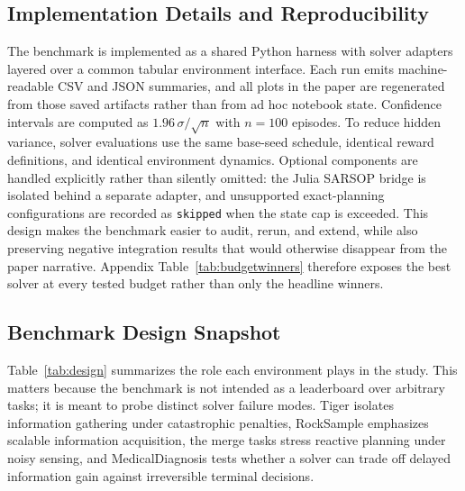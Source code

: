 \documentclass[10pt,twocolumn]{article}
\begin{document}
\subsection{Implementation Details and Reproducibility}
The benchmark is implemented as a shared Python harness with solver adapters layered over a common tabular environment interface. Each run emits machine-readable CSV and JSON summaries, and all plots in the paper are regenerated from those saved artifacts rather than from ad hoc notebook state. Confidence intervals are computed as $1.96\,\sigma/\sqrt{n}$ with $n=100$ episodes. To reduce hidden variance, solver evaluations use the same base-seed schedule, identical reward definitions, and identical environment dynamics. Optional components are handled explicitly rather than silently omitted: the Julia SARSOP bridge is isolated behind a separate adapter, and unsupported exact-planning configurations are recorded as \texttt{skipped} when the state cap is exceeded. This design makes the benchmark easier to audit, rerun, and extend, while also preserving negative integration results that would otherwise disappear from the paper narrative. Appendix Table~\ref{tab:budgetwinners} therefore exposes the best solver at every tested budget rather than only the headline winners.

\subsection{Benchmark Design Snapshot}
Table~\ref{tab:design} summarizes the role each environment plays in the study. This matters because the benchmark is not intended as a leaderboard over arbitrary tasks; it is meant to probe distinct solver failure modes. Tiger isolates information gathering under catastrophic penalties, RockSample emphasizes scalable information acquisition, the merge tasks stress reactive planning under noisy sensing, and MedicalDiagnosis tests whether a solver can trade off delayed information gain against irreversible terminal decisions.
\end{document}
